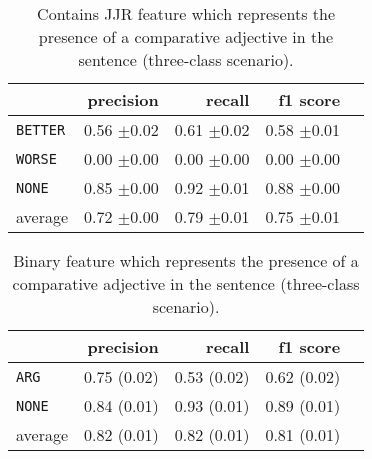 	
	\begin{table}[h] 
		\centering 
		\caption{Contains JJR feature which represents the presence of a comparative adjective in the sentence (three-class scenario).} 
		\label{ }
		\begin{tabular}{@{}lrrrr@{}}
			\toprule
			        & precision                & recall                   & f1 score                 \\ \midrule 
\texttt	{BETTER}	&	 0.56 \scriptsize{$\pm$0.02} &	 0.61 \scriptsize{$\pm$0.02} &	 0.58 \scriptsize{$\pm$0.01}  \\ 
\texttt	{WORSE}	&	 0.00 \scriptsize{$\pm$0.00} &	 0.00 \scriptsize{$\pm$0.00} &	 0.00 \scriptsize{$\pm$0.00}  \\ 
\texttt	{NONE}	&	 0.85 \scriptsize{$\pm$0.00} &	 0.92 \scriptsize{$\pm$0.01} &	 0.88 \scriptsize{$\pm$0.00}  \\ 
average	&	 0.72 \scriptsize{$\pm$0.00} &	 0.79 \scriptsize{$\pm$0.01} &	 0.75 \scriptsize{$\pm$0.01}  \\ 
			\bottomrule
		\end{tabular}
	\end{table}
	
		\begin{table}[h] 
		\centering 
		\caption{ Binary feature which represents the presence of a comparative adjective in the sentence (three-class scenario). } 
		\label{  }
		\begin{tabular}{@{}lrrrr@{}}
			\toprule
			        & precision                & recall                   & f1 score                 \\ \midrule 
			\texttt{ARG}     & 0.75 \scriptsize{(0.02)} & 0.53 \scriptsize{(0.02)} & 0.62 \scriptsize{(0.02)} \\ 
			\texttt{NONE}    & 0.84 \scriptsize{(0.01)} & 0.93 \scriptsize{(0.01)} & 0.89 \scriptsize{(0.01)} \\ 
			average & 0.82 \scriptsize{(0.01)} & 0.82 \scriptsize{(0.01)} & 0.81 \scriptsize{(0.01)} \\ 
			\bottomrule
		\end{tabular}
	\end{table}
	
